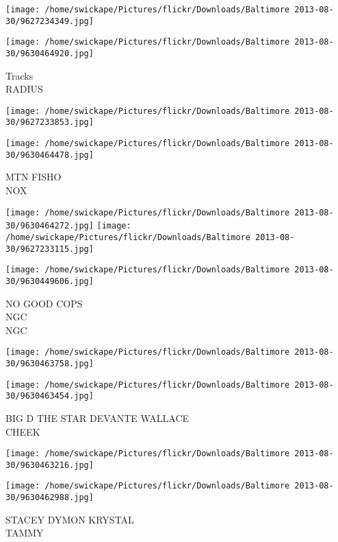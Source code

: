 \documentclass[10pt,letterpaper]{article}
\begin{document}
\texttt{[image: /home/swickape/Pictures/flickr/Downloads/Baltimore 2013-08-30/9627234349.jpg]}

\vspace{0.25in}
\texttt{[image: /home/swickape/Pictures/flickr/Downloads/Baltimore 2013-08-30/9630464920.jpg]}

Tracks\\
RADIUS\\
\pagebreak

\texttt{[image: /home/swickape/Pictures/flickr/Downloads/Baltimore 2013-08-30/9627233853.jpg]}

\vspace{0.25in}
\texttt{[image: /home/swickape/Pictures/flickr/Downloads/Baltimore 2013-08-30/9630464478.jpg]}

MTN FISHO\\
NOX\\
\pagebreak

\texttt{[image: /home/swickape/Pictures/flickr/Downloads/Baltimore 2013-08-30/9630464272.jpg]}
\texttt{[image: /home/swickape/Pictures/flickr/Downloads/Baltimore 2013-08-30/9627233115.jpg]}

\texttt{[image: /home/swickape/Pictures/flickr/Downloads/Baltimore 2013-08-30/9630449606.jpg]}

NO GOOD COPS\\
NGC\\
NGC\\
\pagebreak

\texttt{[image: /home/swickape/Pictures/flickr/Downloads/Baltimore 2013-08-30/9630463758.jpg]}

\vspace{0.25in}
\texttt{[image: /home/swickape/Pictures/flickr/Downloads/Baltimore 2013-08-30/9630463454.jpg]}

BIG D THE STAR DEVANTE WALLACE\\
CHEEK\\
\pagebreak

\texttt{[image: /home/swickape/Pictures/flickr/Downloads/Baltimore 2013-08-30/9630463216.jpg]}

\vspace{0.25in}
\texttt{[image: /home/swickape/Pictures/flickr/Downloads/Baltimore 2013-08-30/9630462988.jpg]}

STACEY DYMON KRYSTAL\\
TAMMY\\
\pagebreak
\end{document}
